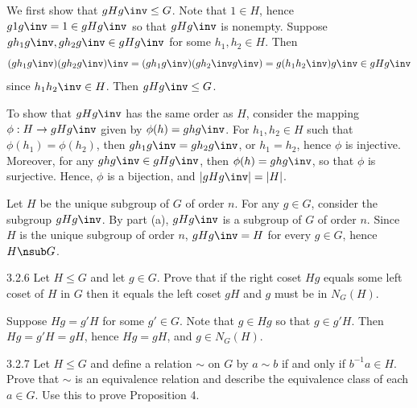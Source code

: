 \begin{solenum}[spsol]
    \item We first show that $gHg\inv \leq G$.
	Note that $1 \in H$, hence $g1g\inv = 1 \in gHg\inv$ so that $gHg\inv$ is nonempty.
	Suppose $gh_1g\inv, gh_2g\inv \in gHg\inv$ for some $h_1, h_2 \in H$.
	Then
    \[
    	(gh_1g\inv)(gh_2g\inv)\inv = (gh_1g\inv)(gh_2\inv g\inv) = g(h_1h_2\inv)g\inv \in gHg\inv
    \]
    since $h_1h_2\inv \in H$.
	Then $gHg\inv \leq G$.

    To show that $gHg\inv$ has the same order as $H$, consider the mapping $\phi : H \to gHg\inv$ given by $\phi(h) = ghg\inv$.
	For $h_1, h_2 \in H$ such that $\phi(h_1) = \phi(h_2)$, then $gh_1g\inv = gh_2g\inv$, or $h_1 = h_2$, hence $\phi$ is injective.
	Moreover, for any $ghg\inv \in gHg\inv$, then $\phi(h) = ghg\inv$, so that $\phi$ is surjective.
	Hence, $\phi$ is a bijection, and $|gHg\inv| = |H|$.
    \item Let $H$ be the unique subgroup of $G$ of order $n$.
	For any $g \in G$, consider the subgroup $gHg\inv$.
	By part (a), $gHg\inv$ is a subgroup of $G$ of order $n$.
	Since $H$ is the unique subgroup of order $n$, $gHg\inv = H$ for every $g \in G$, hence $H \nsub G$.
\end{solenum}

\begin{exercise}{3.2.6}
    Let $H \leq G$ and let $g \in G$.
	Prove that if the right coset $Hg$ equals some left coset of $H$ in $G$ then it equals the left coset $gH$ and $g$ must be in $N_G(H)$.
\end{exercise}

\begin{sol}
    Suppose $Hg = g'H$ for some $g' \in G$.
	Note that $g \in Hg$ so that $g \in g'H$.
	Then $Hg = g'H = gH$, hence $Hg = gH$, and $g \in N_G(H)$.
\end{sol}

\begin{spex}{3.2.7}
    Let $H \leq G$ and define a relation $\sim$ on $G$ by $a \sim b$ if and only if $b^{-1}a \in H$.
	Prove that $\sim$ is an equivalence relation and describe the equivalence class of each $a \in G$.
	Use this to prove Proposition 4.
\end{spex}

